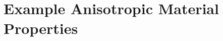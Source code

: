 %




\renewcommand{\chaptergraphicspath}{../src/ExampleProperties/eps/}

\chapterimage{\noheaderimage}

\chapter{Example Anisotropic Material Properties\label{chap:ExampleProperties}}
